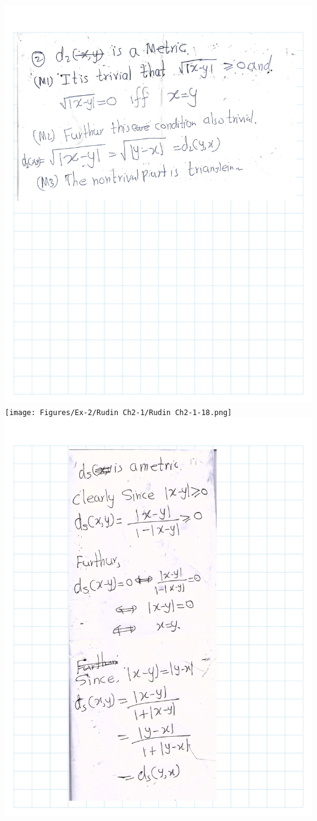\documentclass[
]{book}
\theoremstyle{definition}
\theoremstyle{definition}
\theoremstyle{definition}
\theoremstyle{definition}
\theoremstyle{remark}
\begin{document}
\includegraphics{Figures/Ex-2/Rudin Ch2-1/Rudin Ch2-1-17.png}
\texttt{[image: Figures/Ex-2/Rudin Ch2-1/Rudin Ch2-1-18.png]}
\includegraphics{Figures/Ex-2/Rudin Ch2-1/Rudin Ch2-1-19.png}
\end{document}
